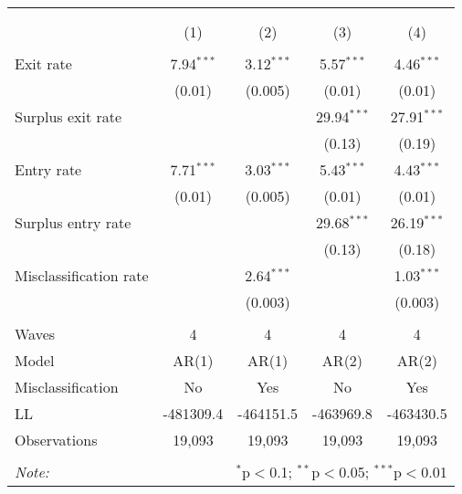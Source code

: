 
\begin{table}[!htbp] \centering 
  \caption{} 
  \label{table_4w_implied} 
\begin{tabular}{@{\extracolsep{5pt}}lcccc} 
\\[-1.8ex]\hline 
\hline \\[-1.8ex] 
\\[-1.8ex] & (1) & (2) & (3) & (4)\\ 
\hline \\[-1.8ex] 
 Exit rate & 7.94$^{***}$ & 3.12$^{***}$ & 5.57$^{***}$ & 4.46$^{***}$ \\ 
  & (0.01) & (0.005) & (0.01) & (0.01) \\ 
  Surplus exit rate &  &  & 29.94$^{***}$ & 27.91$^{***}$ \\ 
  &  &  & (0.13) & (0.19) \\ 
  Entry rate & 7.71$^{***}$ & 3.03$^{***}$ & 5.43$^{***}$ & 4.43$^{***}$ \\ 
  & (0.01) & (0.005) & (0.01) & (0.01) \\ 
  Surplus entry rate &  &  & 29.68$^{***}$ & 26.19$^{***}$ \\ 
  &  &  & (0.13) & (0.18) \\ 
  Misclassification rate &  & 2.64$^{***}$ &  & 1.03$^{***}$ \\ 
  &  & (0.003) &  & (0.003) \\ 
 \hline \\[-1.8ex] 
Waves & 4 & 4 & 4 & 4 \\ 
Model & AR(1) & AR(1) & AR(2) & AR(2) \\ 
Misclassification & No & Yes & No & Yes \\ 
LL & -481309.4 & -464151.5 & -463969.8 & -463430.5 \\ 
Observations & 19,093 & 19,093 & 19,093 & 19,093 \\ 
\hline 
\hline \\[-1.8ex] 
\textit{Note:}  & \multicolumn{4}{r}{$^{*}$p$<$0.1; $^{**}$p$<$0.05; $^{***}$p$<$0.01} \\ 
\end{tabular} 
\end{table} 
